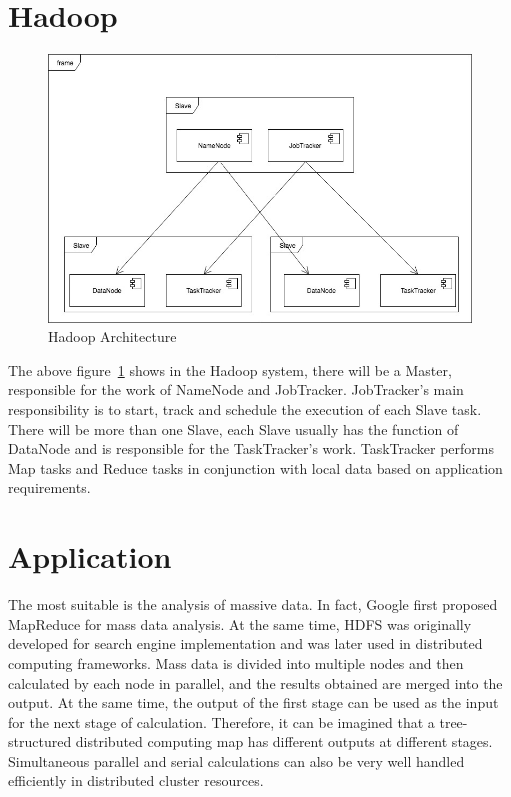 \section{Hadoop}
\begin{figure}[!ht]
  \centering\includegraphics[width=\columnwidth]{images/hadoop.jpg}
  \caption{Hadoop Architecture }\label{f:hadoop}
\end{figure}


The above figure~\ref{f:hadoop} shows in the Hadoop system, there will be a Master, responsible for the work of NameNode and JobTracker. JobTracker's main responsibility is to start, track and schedule the execution of each Slave task. There will be more than one Slave, each Slave usually has the function of DataNode and is responsible for the TaskTracker's work. TaskTracker performs Map tasks and Reduce tasks in conjunction with local data based on application requirements.

\section{Application}
The most suitable is the analysis of massive data. In fact, Google first proposed MapReduce for mass data analysis. At the same time, HDFS was originally developed for search engine implementation and was later used in distributed computing frameworks. Mass data is divided into multiple nodes and then calculated by each node in parallel, and the results obtained are merged into the output. At the same time, the output of the first stage can be used as the input for the next stage of calculation. Therefore, it can be imagined that a tree-structured distributed computing map has different outputs at different stages. Simultaneous parallel and serial calculations can also be very well handled efficiently in distributed cluster resources.

